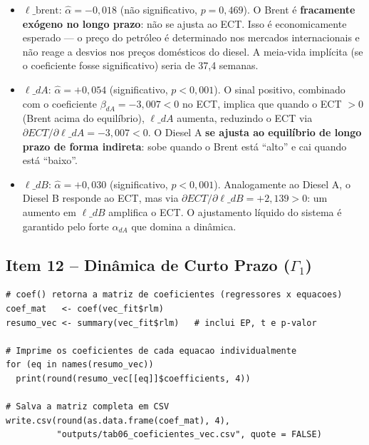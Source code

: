 \documentclass[12pt,a4paper]{article}
\begin{document}
\begin{itemize}
  \item \textbf{$\ell\_\text{brent}$}: $\hat{\alpha} = -0{,}018$ (não significativo, $p = 0{,}469$).
        O Brent é \textbf{fracamente exógeno no longo prazo}: não se ajusta ao ECT.
        Isso é economicamente esperado --- o preço do petróleo é determinado
        nos mercados internacionais e não reage a desvios nos preços domésticos
        do diesel. A meia-vida implícita (se o coeficiente fosse significativo)
        seria de 37,4 semanas.
  \item \textbf{$\ell\_dA$}: $\hat{\alpha} = +0{,}054$ (significativo, $p < 0{,}001$).
        O sinal positivo, combinado com o coeficiente $\beta_{dA} = -3{,}007 < 0$
        no ECT, implica que quando o ECT $> 0$ (Brent acima do equilíbrio),
        $\ell\_dA$ aumenta, reduzindo o ECT via $\partial ECT/\partial \ell\_dA = -3{,}007 < 0$.
        O Diesel A \textbf{se ajusta ao equilíbrio de longo prazo de forma
        indireta}: sobe quando o Brent está ``alto'' e cai quando está ``baixo''.
  \item \textbf{$\ell\_dB$}: $\hat{\alpha} = +0{,}030$ (significativo, $p < 0{,}001$).
        Analogamente ao Diesel A, o Diesel B responde ao ECT,
        mas via $\partial ECT/\partial \ell\_dB = +2{,}139 > 0$: um aumento
        em $\ell\_dB$ amplifica o ECT. O ajustamento líquido do sistema
        é garantido pelo forte $\hat{\alpha}_{dA}$ que domina a dinâmica.
\end{itemize}

\subsection{Item 12 -- Dinâmica de Curto Prazo ($\Gamma_1$)}

\begin{lstlisting}[caption={Coeficientes completos do VECM por equação ($\Gamma_1$ + ECT)}]
# coef() retorna a matriz de coeficientes (regressores x equacoes)
coef_mat   <- coef(vec_fit$rlm)
resumo_vec <- summary(vec_fit$rlm)   # inclui EP, t e p-valor

# Imprime os coeficientes de cada equacao individualmente
for (eq in names(resumo_vec))
  print(round(resumo_vec[[eq]]$coefficients, 4))

# Salva a matriz completa em CSV
write.csv(round(as.data.frame(coef_mat), 4),
          "outputs/tab06_coeficientes_vec.csv", quote = FALSE)
\end{lstlisting}
\end{document}
